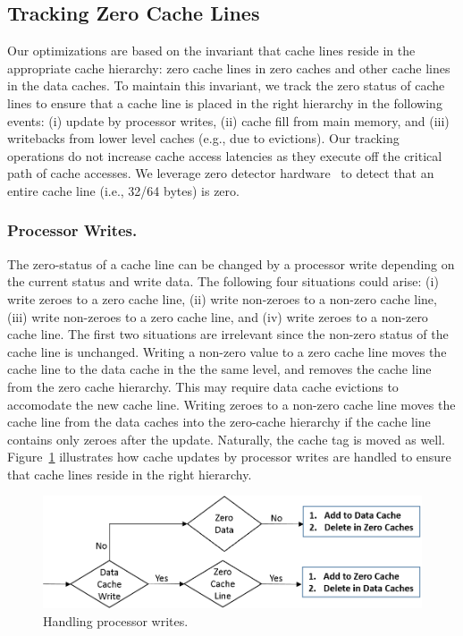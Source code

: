 \subsection{Tracking Zero Cache Lines}

Our optimizations are based on the invariant that cache lines reside in the appropriate cache hierarchy: zero cache lines in zero caches and other cache lines in the data caches. To maintain this invariant, we track the zero status of cache lines to ensure that a cache line is placed in the right hierarchy in the following events: (i) update by processor writes, (ii) cache fill from main memory, and (iii) writebacks from lower level caches (e.g., due to evictions). Our tracking operations do not increase cache access latencies as they execute off the critical path of cache accesses. We leverage zero detector hardware~\cite{Dusser09} to detect that an entire cache line (i.e., 32/64 bytes) is zero.

\subsubsection{Processor Writes.}

The zero-status of a cache line can be changed by a processor write depending on the current status and write data.  The following four situations could arise: (i) write zeroes to a zero cache line, (ii) write non-zeroes to a non-zero cache line, (iii) write non-zeroes to a zero cache line, and (iv) write zeroes to a non-zero cache line.  The first two situations are irrelevant since the non-zero status of the cache line is unchanged.  Writing a non-zero value to a zero cache line moves the cache line to the data cache in the the same level, and removes the cache line from the zero cache hierarchy.  This may require data cache evictions to accomodate the new cache line.  Writing zeroes to a non-zero cache line moves the cache line from the data caches into the zero-cache hierarchy if the cache line contains only zeroes after the update.  Naturally, the cache tag is moved as well.  Figure~\ref{fig:processor_write_flowchart} illustrates how cache updates by processor writes are handled to ensure that cache lines reside in the right hierarchy.  

\begin{figure}[!t]
\centering
\includegraphics[width=0.9\columnwidth]{Figures/processor_write_flowchart.png}
\caption{Handling processor writes.}
\label{fig:processor_write_flowchart}
\end{figure}

